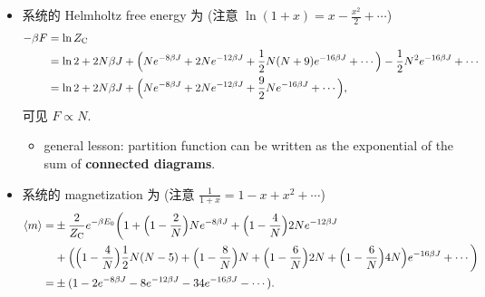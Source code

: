 \begin{itemize}
	\item 系统的 Helmholtz free energy 为 (注意 $\ln(1 + x) = x - \frac{x^2}{2} + \cdots$)
	\begin{align}
		- \beta F &= \ln Z_\text{C} \notag \\
		&= \ln 2 + 2 N \beta J + \Big( N e^{- 8 \beta J} + 2 N e^{- 12 \beta J} + \frac{1}{2} N (N + 9) e^{- 16 \beta J} + \cdots \Big) - \frac{1}{2} N^2 e^{- 16 \beta J} + \cdots \notag \\
		&= \ln 2 + 2 N \beta J + \Big( N e^{- 8 \beta J} + 2 N e^{- 12 \beta J} + \frac{9}{2} N e^{- 16 \beta J} + \cdots \Big),
	\end{align}
	可见 $F \propto N$.
	\begin{itemize}
		\item general lesson: partition function can be written as the exponential of the sum of \textbf{connected diagrams}.
	\end{itemize}
	
	\item 系统的 magnetization 为 (注意 $\frac{1}{1 + x} = 1 - x + x^2 + \cdots$)
	\begin{align}
		\braket{m} =& \pm \frac{2}{Z_\text{C}} e^{- \beta E_0} \bigg( 1 + \Big( 1 - \frac{2}{N} \Big) N e^{- 8 \beta J} + \Big( 1 - \frac{4}{N} \Big) 2 N e^{- 12 \beta J} \notag \\
		& + \Big( \Big( 1 - \frac{4}{N} \Big) \frac{1}{2} N (N - 5) + \Big( 1 - \frac{8}{N} \Big) N + \Big( 1 - \frac{6}{N} \Big) 2 N + \Big( 1 - \frac{6}{N} \Big) 4 N \Big) e^{- 16 \beta J} + \cdots \bigg) \notag \\
		=& \pm (1 - 2 e^{- 8 \beta J} - 8 e^{- 12 \beta J} - 34 e^{- 16 \beta J} - \cdots).
	\end{align}
\end{itemize}


